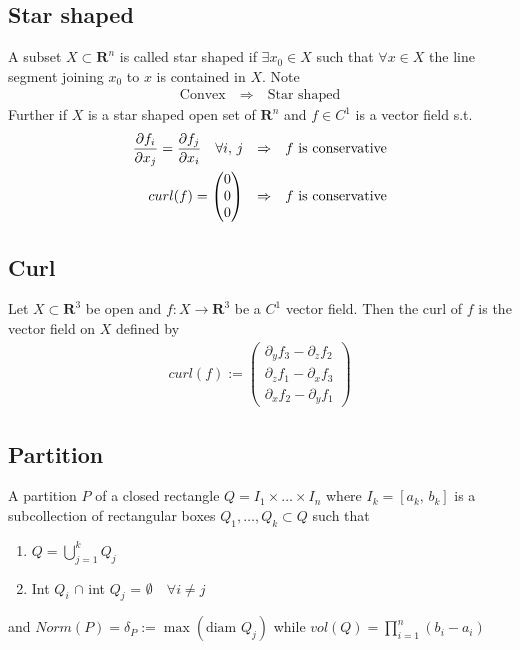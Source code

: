 \documentclass[8pt]{extarticle}
\newcommand{\R}{{\mathbb R}}
\newcommand{\X}{{\mathcal X}}
\newcommand{\ra}{{\rightarrow}}
\newcommand{\Ra}{{\Rightarrow}}
\def\R{\mathbf{R}}
\def\X{X}
\begin{document}
\begin{multicols*}{3}
  \subsection{Star shaped}
  A subset $\X \subset \R^n$ is called star shaped if $\exists x_0 \in \X$
  such that $\forall x \in \X$ the line segment joining $x_0$ to $x$
  is contained in $\X$. Note
  \begin{align*}
    \text{Convex} \quad \Ra \quad \text{Star shaped}
  \end{align*}
  Further if $\X$ is a star shaped open set of $\R^n$ and $f \in C^1$
  is a vector field s.t.
  \begin{align*}
    \pdv{f_i}{x_j} = \pdv{f_j}{x_i} \quad \forall i,\, j
    \quad & \Ra \quad \text{$f$ is conservative} \\
    curl(f) = \begin{pmatrix}
      0 \\0\\0
    \end{pmatrix}
    \quad & \Ra \quad \text{$f$ is conservative} \\
  \end{align*}
  \subsection{Curl}
  Let $\X \subset \R^3$ be open and $f: \X \ra \R^3$ be a $C^1$ vector field.
  Then the curl of $f$ is the vector field on $\X$ defined by
  \begin{align*}
    curl(f) :=
    \begin{pmatrix}
      \partial_y f_3 - \partial_z f_2 \\
      \partial_z f_1 - \partial_x f_3 \\
      \partial_x f_2 - \partial_y f_1
    \end{pmatrix}
  \end{align*}
  \subsection{Partition}
  A partition $P$ of a closed rectangle $Q = I_1 \times \dots \times I_n$
  where $I_k = [a_k,\, b_k]$ is a subcollection of rectangular boxes
  $Q_1, \dots, Q_k \subset Q$ such that
  \begin{enumerate}[label=(\arabic*)]
    \item $Q = \bigcup_{j = 1}^k Q_j$
    \item Int $Q_i$ $\cap$ int $Q_j$ = $\emptyset \quad \forall i \neq j$
  \end{enumerate}
  and $Norm(P) = \delta_P := \max(\text{diam } Q_j)$ while
  $vol(Q) = \prod_{i = 1}^n (b_i - a_i)$

\end{multicols*}
\end{document}
